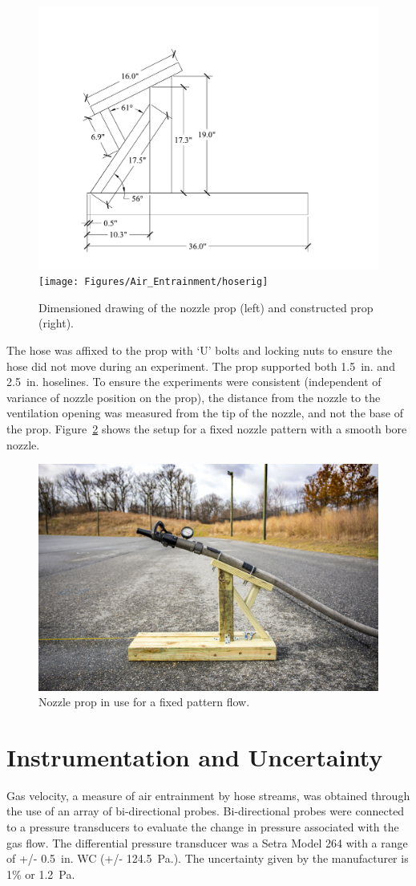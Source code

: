 \documentclass[12pt,oneside]{book}
\begin{document}
\begin{figure}[!ht]
\centering
    \includegraphics[width=.45\columnwidth]{Figures/Water_Distribution/GIBside}
	\texttt{[image: Figures/Air\_Entrainment/hoserig]}
	\caption[Nozzle Prop]{Dimensioned drawing of the nozzle prop (left) and constructed prop (right).}
	\label{fig:Nozzle_Prop}
\end{figure}

The hose was affixed to the prop with `U' bolts and locking nuts to ensure the hose did not move during an experiment. The prop supported both 1.5~in. and 2.5~in. hoselines. To ensure the experiments were consistent (independent of variance of nozzle position on the prop), the distance from the nozzle to the ventilation opening was measured from the tip of the nozzle, and not the base of the prop. Figure~\ref{fig:Nozzle_Prop_in_Use} shows the setup for a fixed nozzle pattern with a smooth bore nozzle.

\begin{figure}[!ht]
\centering
\includegraphics[width=.6\columnwidth]{Figures/Air_Entrainment/gib_hose} 
\caption[Nozzle Prop in Use]{Nozzle prop in use for a fixed pattern flow.}
\label{fig:Nozzle_Prop_in_Use}
\end{figure}

\section{Instrumentation and Uncertainty}
\label{sec:uncert}
Gas velocity, a measure of air entrainment by hose streams, was obtained through the use of an array of bi-directional probes. Bi-directional probes were connected to a pressure transducers to evaluate the change in pressure associated with the gas flow. The differential pressure transducer was a Setra Model 264 with a range of +/- 0.5~in. WC (+/- 124.5~Pa.). The uncertainty given by the manufacturer is 1\% or 1.2~Pa. 
\end{document}
